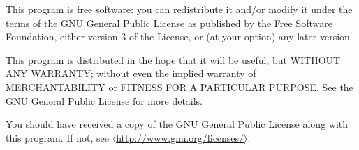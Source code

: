 \documentclass[12pt]{article}
\begin{document}
This program is free software: you can redistribute it and/or modify it under the terms of the GNU General Public License as published by the Free Software Foundation, either version 3 of the License, or (at your option) any later version.

This program is distributed in the hope that it will be useful, but WITHOUT ANY WARRANTY; without even the implied warranty of MERCHANTABILITY or FITNESS FOR A PARTICULAR PURPOSE. See the GNU General Public License for more details.

You should have received a copy of the GNU General Public License along with this program.  If not, see $\langle$\href{http://www.gnu.org/licenses/}{http://www.gnu.org/licenses/}$\rangle$.


\clearpage


\end{document}

